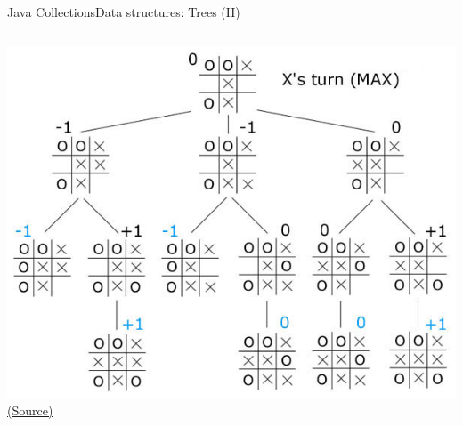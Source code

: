 \documentclass[10pt,compress]{beamer} %
\begin{document}
\begin{frame}{Java Collections}{Data structures: Trees (II)}
\begin{columns}
	   	\begin{center}
		\includegraphics[width=\linewidth]{figs/raya.png}\\
		\tiny{\href{http://www.ocf.berkeley.edu/~yosenl/extras/alphabeta/alphabeta.html}{(Source)}}
	   	\end{center}
		\end{columns}
\end{frame}
\end{document}
